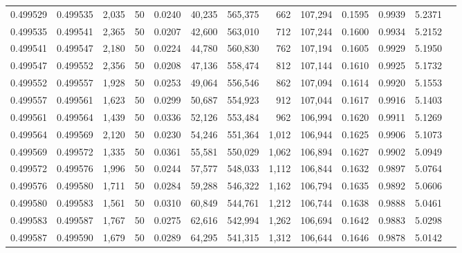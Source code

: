 \begin{tabular}{rrrrrrrrrrrrr}
0.499529 & 0.499535 & 2,035 &  50 &                                     0.0240 &  40,235 & 565,375 &     662 & 107,294 & 0.1595 & 0.9939 & 5.2371 \\
0.499535 & 0.499541 & 2,365 &  50 &                                     0.0207 &  42,600 & 563,010 &     712 & 107,244 & 0.1600 & 0.9934 & 5.2152 \\
0.499541 & 0.499547 & 2,180 &  50 &                                     0.0224 &  44,780 & 560,830 &     762 & 107,194 & 0.1605 & 0.9929 & 5.1950 \\
0.499547 & 0.499552 & 2,356 &  50 &                                     0.0208 &  47,136 & 558,474 &     812 & 107,144 & 0.1610 & 0.9925 & 5.1732 \\
0.499552 & 0.499557 & 1,928 &  50 &                                     0.0253 &  49,064 & 556,546 &     862 & 107,094 & 0.1614 & 0.9920 & 5.1553 \\
0.499557 & 0.499561 & 1,623 &  50 &                                     0.0299 &  50,687 & 554,923 &     912 & 107,044 & 0.1617 & 0.9916 & 5.1403 \\
0.499561 & 0.499564 & 1,439 &  50 &                                     0.0336 &  52,126 & 553,484 &     962 & 106,994 & 0.1620 & 0.9911 & 5.1269 \\
0.499564 & 0.499569 & 2,120 &  50 &                                     0.0230 &  54,246 & 551,364 &   1,012 & 106,944 & 0.1625 & 0.9906 & 5.1073 \\
0.499569 & 0.499572 & 1,335 &  50 &                                     0.0361 &  55,581 & 550,029 &   1,062 & 106,894 & 0.1627 & 0.9902 & 5.0949 \\
0.499572 & 0.499576 & 1,996 &  50 &                                     0.0244 &  57,577 & 548,033 &   1,112 & 106,844 & 0.1632 & 0.9897 & 5.0764 \\
0.499576 & 0.499580 & 1,711 &  50 &                                     0.0284 &  59,288 & 546,322 &   1,162 & 106,794 & 0.1635 & 0.9892 & 5.0606 \\
0.499580 & 0.499583 & 1,561 &  50 &                                     0.0310 &  60,849 & 544,761 &   1,212 & 106,744 & 0.1638 & 0.9888 & 5.0461 \\
0.499583 & 0.499587 & 1,767 &  50 &                                     0.0275 &  62,616 & 542,994 &   1,262 & 106,694 & 0.1642 & 0.9883 & 5.0298 \\
0.499587 & 0.499590 & 1,679 &  50 &                                     0.0289 &  64,295 & 541,315 &   1,312 & 106,644 & 0.1646 & 0.9878 & 5.0142 \\

\end{tabular}
